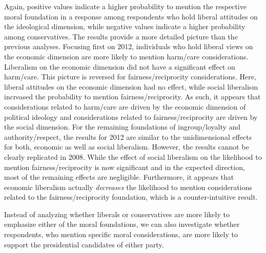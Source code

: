 \documentclass[12pt]{article}
\begin{document}
Again, positive values indicate a higher probability to mention the respective moral foundation in a response among respondents who hold liberal attitudes on the ideological dimension, while negative values indicate a higher probability among conservatives. The results provide a more detailed picture than the previous analyses. Focusing first on 2012, individuals who hold liberal views on the economic dimension are more likely to mention harm/care considerations. Liberalism on the economic dimension did not have a significant effect on harm/care. This picture is reversed for fairness/reciprocity considerations. Here, liberal attitudes on the economic dimension had no effect, while social liberalism increased the probability to mention fairness/reciprocity. As such, it appears that considerations related to harm/care are driven by the economic dimension of political ideology and considerations related to fairness/reciprocity are driven by the social dimension. For the remaining foundations of ingroup/loyalty and authority/respect, the results for 2012 are similar to the unidimensional effects for both, economic as well as social liberalism. However, the results cannot be clearly replicated in 2008. While the effect of social liberalism on the likelihood to mention fairness/reciprocity is now significant and in the expected direction, most of the remaining effects are negligible. Furthermore, it appears that economic liberalism actually \textit{decreases} the likelihood to mention considerations related to the fairness/reciprocity foundation, which is a counter-intuitive result.

Instead of analyzing whether liberals or conservatives are more likely to emphasize either of the moral foundations, we can also investigate whether respondents, who mention specific moral considerations, are more likely to support the presidential candidates of either party. 
\end{document}
